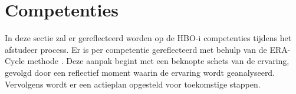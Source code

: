 \section{Competenties}
In deze sectie zal er gereflecteerd worden op de HBO-i \parencite{HBOICompetenties} competenties tijdens het afstudeer process.
Er is per competentie gereflecteerd met behulp van de ERA-Cycle methode \parencite{BeginningReflectivePractice}.
Deze aanpak begint met een beknopte schets van de ervaring, gevolgd door een reflectief moment waarin de ervaring wordt geanalyseerd.
Vervolgens wordt er een actieplan opgesteld voor toekomstige stappen.


\newpage





